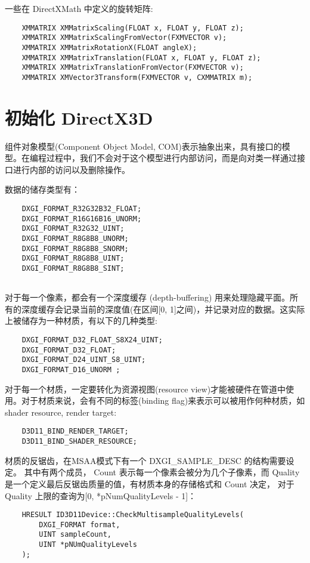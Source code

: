 \documentclass[10pt, a4paper]{article}
\begin{document}
    一些在 DirectXMath 中定义的旋转矩阵: 
\begin{lstlisting}
    XMMATRIX XMMatrixScaling(FLOAT x, FLOAT y, FLOAT z); 
    XMMATRIX XMMatrixScalingFromVector(FXMVECTOR v); 
    XMMATRIX XMMatrixRotationX(FLOAT angleX);
    XMMATRIX XMMatrixTranslation(FLOAT x, FLOAT y, FLOAT z);
    XMMATRIX XMMatrixTranslationFromVector(FXMVECTOR v); 
    XMMATRIX XMVector3Transform(FXMVECTOR v, CXMMATRIX m);  
\end{lstlisting}
\newpage 

\section{初始化 DirectX3D}
    组件对象模型(Component Object Model, COM)表示抽象出来，具有接口的模型。在编程过程中，我们不会对于这个模型进行内部访问，而是向对类一样通过接口进行内部的访问以及删除操作。 

    数据的储存类型有： 

\begin{lstlisting}
    DXGI_FORMAT_R32G32B32_FLOAT;
    DXGI_FORMAT_R16G16B16_UNORM;
    DXGI_FORMAT_R32G32_UINT;
    DXGI_FORMAT_R8G8B8_UNORM;
    DXGI_FORMAT_R8G8B8_SNORM;
    DXGI_FORMAT_R8G8B8_UINT;
    DXGI_FORMAT_R8G8B8_SINT;
    
\end{lstlisting}

    对于每一个像素，都会有一个深度缓存 (depth-buffering) 用来处理隐藏平面。所有的深度缓存会记录当前的深度值(在区间[0, 1]之间)，并记录对应的数据。这实际上被储存为一种材质，有以下的几种类型:
\begin{lstlisting}
    DXGI_FORMAT_D32_FLOAT_S8X24_UINT; 
    DXGI_FORMAT_D32_FLOAT;
    DXGI_FORMAT_D24_UINT_S8_UINT;
    DXGI_FORMAT_D16_UNORM ;
\end{lstlisting} 

    对于每一个材质，一定要转化为资源视图(resource view)才能被硬件在管道中使用。对于材质来说，会有不同的标签(binding flag)来表示可以被用作何种材质，如 shader resource, render target:
\begin{lstlisting}
    D3D11_BIND_RENDER_TARGET; 
    D3D11_BIND_SHADER_RESOURCE; 
\end{lstlisting}

    材质的反锯齿，在MSAA模式下有一个 DXGI\_SAMPLE\_DESC 的结构需要设定。 其中有两个成员， Count 表示每一个像素会被分为几个子像素，而 Quality 是一个定义最后反锯齿质量的值，有材质本身的存储格式和 Count 决定， 对于 Quality 上限的查询为[0, *pNumQualityLevels - 1]： 

\begin{lstlisting}
    HRESULT ID3D11Device::CheckMultisampleQualityLevels(
        DXGI_FORMAT format, 
        UINT sampleCount, 
        UINT *pNUmQualityLevels
    );
\end{lstlisting}
\end{document}
